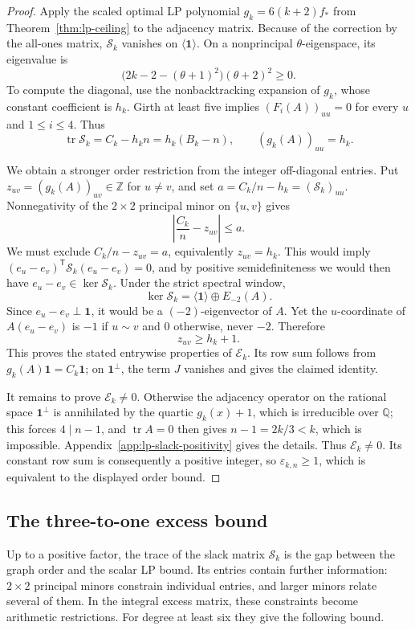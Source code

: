\documentclass[a4paper,10pt,reqno]{amsart}
\theoremstyle{plain}
\theoremstyle{definition}
\theoremstyle{remark}
\newcommand{\one}{\mathbf 1}
\newcommand{\tr}{\operatorname{tr}}
\begin{document}
\begin{proof}
Apply the scaled optimal LP polynomial \(g_k=6(k+2)f_*\) from
Theorem~\ref{thm:lp-ceiling} to the adjacency matrix. Because of the
correction by the all-ones matrix, \(\mathcal S_k\) vanishes on
\(\langle\one\rangle\).
On a nonprincipal
\(\theta\)-eigenspace, its eigenvalue is
\[
 \bigl(2k-2-(\theta+1)^2\bigr)(\theta+2)^2\ge0.
\]
To compute the diagonal, use the nonbacktracking expansion of \(g_k\),
whose constant coefficient is \(h_k\).  Girth at least five implies
\((F_i(A))_{uu}=0\) for every \(u\) and \(1\le i\le4\).  Thus
\[
 \tr\mathcal S_k=C_k-h_kn=h_k(B_k-n),
 \qquad (g_k(A))_{uu}=h_k.
\]

We obtain a stronger order restriction from the integer off-diagonal
entries. Put
\(z_{uv}=(g_k(A))_{uv}\in\mathbb Z\) for \(u\ne v\), and set
\(a=C_k/n-h_k=(\mathcal S_k)_{uu}\).  Nonnegativity of the \(2\times2\)
principal minor on \(\{u,v\}\) gives
\[
 \left|\frac{C_k}{n}-z_{uv}\right|\le a.
\]
We must exclude \(C_k/n-z_{uv}=a\), equivalently \(z_{uv}=h_k\). This would imply
\((e_u-e_v)^{\mathsf T}\mathcal S_k(e_u-e_v)=0\), and by positive semidefiniteness
we would then have \(e_u-e_v\in\ker\mathcal S_k\). Under the strict spectral
window,
\[
 \ker\mathcal S_k=\langle\one\rangle\oplus E_{-2}(A).
\]
Since \(e_u-e_v\perp\one\), it would be a \((-2)\)-eigenvector of \(A\).
Yet the \(u\)-coordinate of \(A(e_u-e_v)\) is \(-1\) if \(u\sim v\) and
\(0\) otherwise, never \(-2\).  Therefore
\[
 z_{uv}\ge h_k+1.
\]
This proves the stated entrywise properties of \(\mathcal E_k\).
Its row sum follows from \(g_k(A)\one=C_k\one\); on \(\one^\perp\),
the term \(J\) vanishes and gives the claimed identity.

It remains to prove \(\mathcal E_k\ne0\). Otherwise the adjacency operator
on the rational space \(\one^\perp\) is annihilated by the quartic
\(g_k(x)+1\), which is irreducible over \(\mathbb Q\); this forces
\(4\mid n-1\), and \(\tr A=0\) then gives \(n-1=2k/3<k\), which is
impossible. Appendix~\ref{app:lp-slack-positivity} gives the details. Thus
\(\mathcal E_k\ne0\).  Its constant row sum is consequently a positive
integer, so \(\varepsilon_{k,n}\ge1\), which is equivalent to the displayed
order bound.
\end{proof}

\subsection{The three-to-one excess bound}

Up to a positive factor, the trace of the slack matrix \(\mathcal S_k\) is the gap between
the graph order and the scalar LP bound. Its entries contain further
information: \(2\times2\) principal minors constrain individual entries,
and larger minors relate several of them. In the integral excess matrix,
these constraints become arithmetic restrictions. For degree at least six
they give the following bound.
\end{document}

